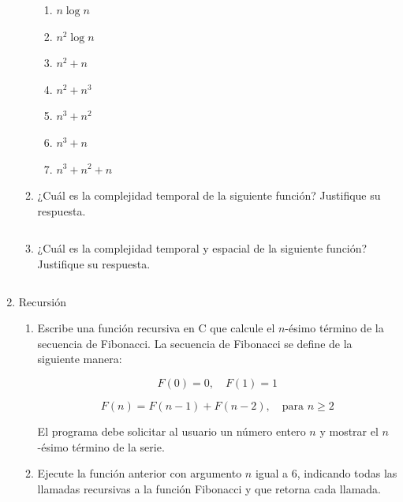 \documentclass[12pt]{article}
\begin{document}
\begin{titlepage}
\begin{enumerate}
\begin{enumerate}[label*=\arabic*.]
\begin{multicols}{3}
\begin{enumerate}
                    \item $n \log n$
                    \item $n^2 \log n$
                    \item $n^2 + n$
                    \item $n^2 + n^3$
                    \item $n^3 + n^2$
                    \item $n^3 + n$
                    \item $n^3 + n^2 + n$
                \end{enumerate}
                \end{multicols}
                \item ¿Cuál es la complejidad temporal de la siguiente función? Justifique su respuesta.
                \begin{lstlisting}[language=C]
                \end{lstlisting}
                \item ¿Cuál es la complejidad temporal y espacial de la siguiente función? Justifique su respuesta.
                \begin{lstlisting}[language=C]
                \end{lstlisting}

            \end{enumerate}
            \item Recursión
            \begin{enumerate}[label*=\arabic*.]
                \item Escribe una función recursiva en C que calcule el $n$-ésimo término de la secuencia de Fibonacci. La secuencia de Fibonacci se define de la siguiente manera:

                \[
                F(0) = 0, \quad F(1) = 1
                \]
                
                \[
                F(n) = F(n-1) + F(n-2), \quad \text{para } n \geq 2
                \]
                
                El programa debe solicitar al usuario un número entero $n$ y mostrar el $n$-ésimo término de la serie.
                \item Ejecute la función anterior con argumento $n$ igual a 6, indicando todas las llamadas recursivas a la función Fibonacci y que retorna cada llamada.
            \end{enumerate}
        \end{enumerate}
    \end{titlepage}
\end{document}
